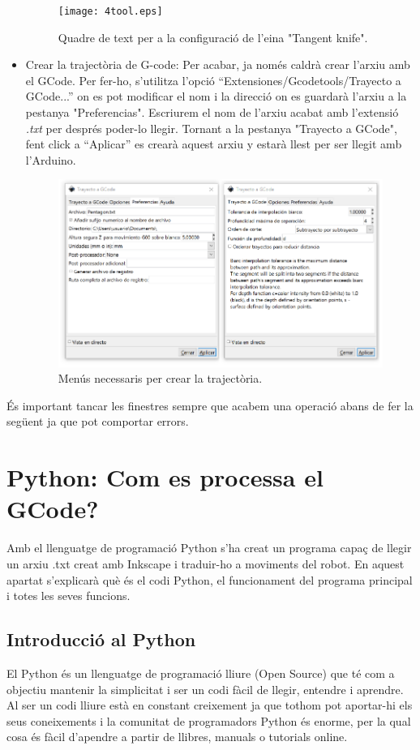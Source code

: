 \begin{itemize}
	\begin{figure}[H]
		\centering
		\texttt{[image: 4tool.eps]}
		\caption{Quadre de text per a la configuració de l'eina "Tangent knife".}
		\label{fig:tool}
	\end{figure}
	
	\item Crear la trajectòria de G-code: Per acabar, ja només caldrà crear l'arxiu amb el GCode. Per fer-ho, s'utilitza l'opció “Extensiones/Gcodetools/Trayecto a GCode...” on es pot modificar el nom i la direcció on es guardarà l'arxiu a la pestanya "Preferencias". Escriurem el nom de l'arxiu acabat amb l'extensió \emph{.txt} per després poder-lo llegir. Tornant a la pestanya "Trayecto a GCode", fent click a  “Aplicar” es crearà aquest arxiu y estarà llest per ser llegit amb l'Arduino.
	
	\begin{figure}[H]
		\centering
		\includegraphics[width=0.60\linewidth]{5Trajectoria.eps}
		\caption{Menús necessaris per crear la trajectòria.}
		\label{fig:trayecto}
	\end{figure}
	
\end{itemize}
És important tancar les finestres sempre que acabem una operació abans de fer la següent ja que pot comportar errors. 

\section{Python: Com es processa el GCode?}

Amb el llenguatge de programació Python s’ha creat un programa capaç de llegir un arxiu .txt creat amb Inkscape i traduir-ho a moviments del robot. En aquest apartat s’explicarà què és el codi Python, el funcionament del programa principal i totes les seves funcions. 

\subsection{Introducció al Python}
El Python és un llenguatge de programació lliure (Open Source) que té com a objectiu mantenir la simplicitat i ser un codi fàcil de llegir, entendre i aprendre. Al ser un codi lliure està en constant creixement ja que tothom pot aportar-hi els seus coneixements i la comunitat de programadors Python és enorme, per la qual cosa és fàcil d’apendre a partir de llibres, manuals o tutorials online. 

